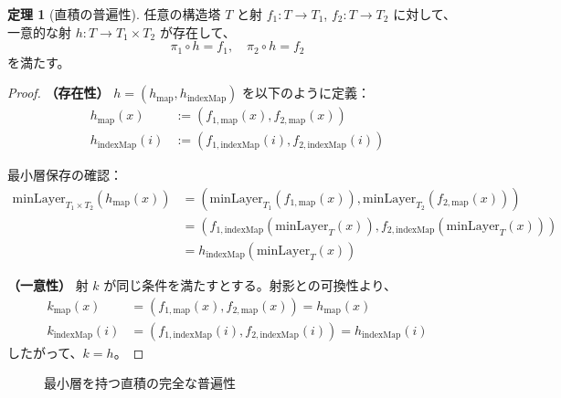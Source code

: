 \documentclass[a4paper,12pt]{ltjsarticle}
\theoremstyle{definition}
\newtheorem{theorem}[definition]{定理}
\begin{document}
\begin{theorem}[直積の普遍性]
\label{thm:product-universality-complete}
任意の構造塔 $T$ と射 $f_1: T \to T_1$, $f_2: T \to T_2$ に対して、一意的な射 $h: T \to T_1 \times T_2$ が存在して、
\[
\pi_1 \circ h = f_1, \quad \pi_2 \circ h = f_2
\]
を満たす。
\end{theorem}

\begin{proof}
\textbf{（存在性）}
$h = (h_{\text{map}}, h_{\text{indexMap}})$ を以下のように定義：
\begin{align*}
h_{\text{map}}(x) &:= (f_{1,\text{map}}(x), f_{2,\text{map}}(x)) \\
h_{\text{indexMap}}(i) &:= (f_{1,\text{indexMap}}(i), f_{2,\text{indexMap}}(i))
\end{align*}

最小層保存の確認：
\begin{align*}
\mathrm{minLayer}_{T_1 \times T_2}(h_{\text{map}}(x)) &= (\mathrm{minLayer}_{T_1}(f_{1,\text{map}}(x)), \mathrm{minLayer}_{T_2}(f_{2,\text{map}}(x))) \\
&= (f_{1,\text{indexMap}}(\mathrm{minLayer}_T(x)), f_{2,\text{indexMap}}(\mathrm{minLayer}_T(x))) \\
&= h_{\text{indexMap}}(\mathrm{minLayer}_T(x))
\end{align*}

\textbf{（一意性）}
射 $k$ が同じ条件を満たすとする。射影との可換性より、
\begin{align*}
k_{\text{map}}(x) &= (f_{1,\text{map}}(x), f_{2,\text{map}}(x)) = h_{\text{map}}(x) \\
k_{\text{indexMap}}(i) &= (f_{1,\text{indexMap}}(i), f_{2,\text{indexMap}}(i)) = h_{\text{indexMap}}(i)
\end{align*}
したがって、$k = h$。
\end{proof}

\begin{figure}[h]
\centering
{}
\caption{最小層を持つ直積の完全な普遍性}
\label{fig:product-universality-complete}
\end{figure}
\end{document}
